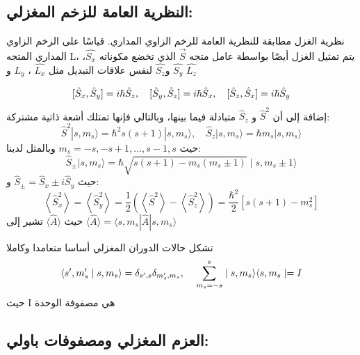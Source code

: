 \subsection{النظرية العامة للزخم المغزلي:}
نظرية الغزل مطابقة للنظرية العامة للزخم الزاوي المداري. قياسًا على الزخم الزاوي المداري المتجه L، يتم تمثيل الغزل أيضًا بواسطة عامل متجه $\vec{S}$ الذي تخضع مكوناته
 $\hat{S_{x}}$،$\hat{S_{y}}$ و$\hat{S_{z}}$  
 لنفس علاقات التبديل مثل 
$\hat{L_{x}}$ ، $\hat{L_{y}}$ و $\hat{L_{z}}$ 

\begin{equation}
	 {[\hat{S}_x, \hat{S}_y]=i \hbar \hat{S}_z, \quad[\hat{S}_y, \hat{S}_z]=i \hbar \hat{S}_x, \quad[\hat{S}_z, \hat{S}_x]=i \hbar \hat{S}_y } \\
\end{equation}
إضافة إلى أن 
$\hat{S}^2$ و $\hat{S}_z $
متبادلة فيما بينها، وبالتالي فإنها تمتلك أشعة ذاتية مشتركة:
\begin{equation}
	\hat{S}^2|s, m_s\rangle=\hbar^2 s(s+1)|s, m_s\rangle, \quad \hat{S}_z|s, m_s\rangle=\hbar m_s|s, m_s\rangle
\end{equation}
حيث 
  ${m}_{s}=-s, -s+1,..., s-1, s $ 
  وبالمثل لدينا:
\begin{equation}
	\hat{S}_{ \pm}|s, m_s\rangle=\hbar \sqrt{s(s+1)-m_s(m_s \pm 1)} \mid s, m_s \pm 1\rangle
\end{equation}
حيث $\hat{S}_{ \pm}=\hat{S}_x \pm i \hat{S}_y$ و:
\begin{equation}
	\left\langle\hat{S}_x^2\right\rangle=\left\langle\hat{S}_y^2\right\rangle=\frac{1}{2}\left(\left\langle\hat{S}^2\right\rangle-\left\langle\hat{S}_z^2\right\rangle\right)=\frac{\hbar^2}{2}\left[s(s+1)-m_s^2\right]
\end{equation}
حيث $\langle\hat{A}\rangle$ تشير إلى 	
$\langle\hat{A}\rangle= \langle s, m_s|\hat{A} |s, m_s\rangle$ 


تشكل حالات الدوران المغزلي أساسا متعامدا وكاملا
\begin{equation}
	\left\langle s^{\prime}, m_s^{\prime} \mid s, m_s\right\rangle=\delta_{s^{\prime}, s} \delta_{m_s^{\prime}, m_s} , \\\quad
	\sum_{m_s = -s}^s \mid s, m_s\rangle\langle s, m_s \mid=I
\end{equation}
حيث I هي مصفوفة الوحدة

\subsection{العزم المغزلي ومصفوفات باولي:}

